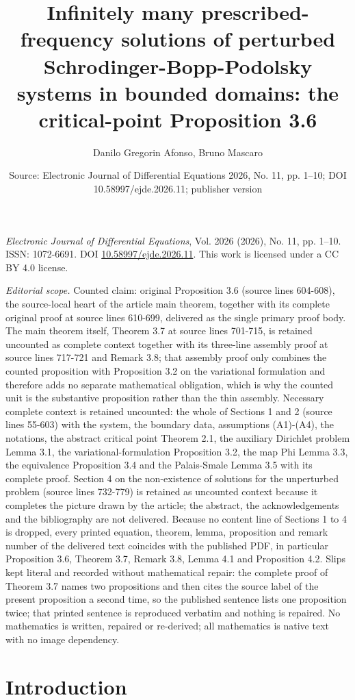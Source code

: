 \documentclass[10pt,a4paper]{amsart}
\title[Existence of solutions with prescribed frequency for perturbed Schrodinger-Bopp-Podolsky systems in bounded domains]{Infinitely many prescribed-frequency solutions of perturbed Schrodinger-Bopp-Podolsky systems in bounded domains: the critical-point Proposition 3.6}
\author{Danilo Gregorin Afonso, Bruno Mascaro}
\date{Source: Electronic Journal of Differential Equations 2026, No. 11, pp. 1--10; DOI 10.58997/ejde.2026.11; publisher version}
\numberwithin{equation}{section}
\begin{document}
\maketitle
\noindent\emph{Electronic Journal of Differential Equations}, Vol. 2026 (2026), No. 11, pp. 1--10.\newline
ISSN: 1072-6691. DOI \href{https://doi.org/10.58997/ejde.2026.11}{10.58997/ejde.2026.11}. This work is licensed under a CC BY 4.0 license.\par\smallskip
\noindent\textit{Editorial scope.} Counted claim: original Proposition 3.6 (source lines 604-608), the source-local heart of the article main theorem, together with its complete original proof at source lines 610-699, delivered as the single primary proof body. The main theorem itself, Theorem 3.7 at source lines 701-715, is retained uncounted as complete context together with its three-line assembly proof at source lines 717-721 and Remark 3.8; that assembly proof only combines the counted proposition with Proposition 3.2 on the variational formulation and therefore adds no separate mathematical obligation, which is why the counted unit is the substantive proposition rather than the thin assembly. Necessary complete context is retained uncounted: the whole of Sections 1 and 2 (source lines 55-603) with the system, the boundary data, assumptions (A1)-(A4), the notations, the abstract critical point Theorem 2.1, the auxiliary Dirichlet problem Lemma 3.1, the variational-formulation Proposition 3.2, the map Phi Lemma 3.3, the equivalence Proposition 3.4 and the Palais-Smale Lemma 3.5 with its complete proof. Section 4 on the non-existence of solutions for the unperturbed problem (source lines 732-779) is retained as uncounted context because it completes the picture drawn by the article; the abstract, the acknowledgements and the bibliography are not delivered. Because no content line of Sections 1 to 4 is dropped, every printed equation, theorem, lemma, proposition and remark number of the delivered text coincides with the published PDF, in particular Proposition 3.6, Theorem 3.7, Remark 3.8, Lemma 4.1 and Proposition 4.2. Slips kept literal and recorded without mathematical repair: the complete proof of Theorem 3.7 names two propositions and then cites the source label of the present proposition a second time, so the published sentence lists one proposition twice; that printed sentence is reproduced verbatim and nothing is repaired. No mathematics is written, repaired or re-derived; all mathematics is native text with no image dependency.
\section{Introduction} 
\label{sec:intro}
\end{document}
